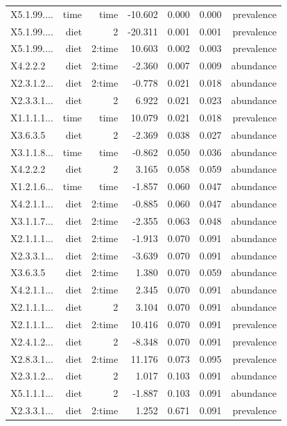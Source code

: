 \documentclass[
  letterpaper,
  DIV=11,
  numbers=noendperiod]{scrartcl}
\begin{document}
\begin{longtable}[t]{lrrrrrr}
\endfoot
\bottomrule
\endlastfoot
X5.1.99.... & time & time & -10.602 & 0.000 & 0.000 & prevalence\\
X5.1.99.... & diet & 2 & -20.311 & 0.001 & 0.001 & prevalence\\
X5.1.99.... & diet & 2:time & 10.603 & 0.002 & 0.003 & prevalence\\
X4.2.2.2 & diet & 2:time & -2.360 & 0.007 & 0.009 & abundance\\
X2.3.1.2... & diet & 2:time & -0.778 & 0.021 & 0.018 & abundance\\
\addlinespace
X2.3.3.1... & diet & 2 & 6.922 & 0.021 & 0.023 & abundance\\
X1.1.1.1... & time & time & 10.079 & 0.021 & 0.018 & prevalence\\
X3.6.3.5 & diet & 2 & -2.369 & 0.038 & 0.027 & abundance\\
X3.1.1.8... & time & time & -0.862 & 0.050 & 0.036 & abundance\\
X4.2.2.2 & diet & 2 & 3.165 & 0.058 & 0.059 & abundance\\
\addlinespace
X1.2.1.6... & time & time & -1.857 & 0.060 & 0.047 & abundance\\
X4.2.1.1... & diet & 2:time & -0.885 & 0.060 & 0.047 & abundance\\
X3.1.1.7... & diet & 2:time & -2.355 & 0.063 & 0.048 & abundance\\
X2.1.1.1... & diet & 2:time & -1.913 & 0.070 & 0.091 & abundance\\
X2.3.3.1... & diet & 2:time & -3.639 & 0.070 & 0.091 & abundance\\
\addlinespace
X3.6.3.5 & diet & 2:time & 1.380 & 0.070 & 0.059 & abundance\\
X4.2.1.1... & diet & 2:time & 2.345 & 0.070 & 0.091 & abundance\\
X2.1.1.1... & diet & 2 & 3.104 & 0.070 & 0.091 & abundance\\
X2.1.1.1... & diet & 2:time & 10.416 & 0.070 & 0.091 & prevalence\\
X2.4.1.2... & diet & 2 & -8.348 & 0.070 & 0.091 & prevalence\\
\addlinespace
X2.8.3.1... & diet & 2:time & 11.176 & 0.073 & 0.095 & prevalence\\
X2.3.1.2... & diet & 2 & 1.017 & 0.103 & 0.091 & abundance\\
X5.1.1.1... & diet & 2 & -1.887 & 0.103 & 0.091 & abundance\\
X2.3.3.1... & diet & 2:time & 1.252 & 0.671 & 0.091 & prevalence\\

\end{longtable}
\end{document}
